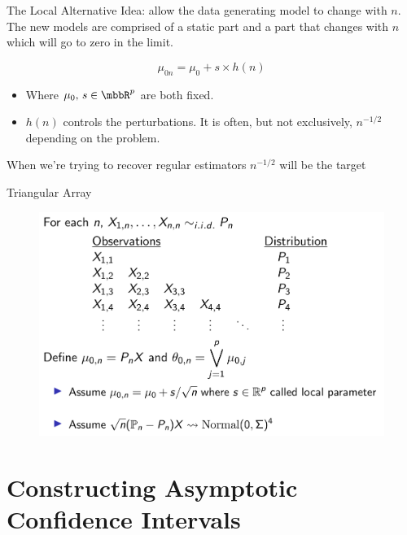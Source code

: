 \documentclass[aspectratio=169, professionalfonts]{beamer}
\begin{document}
\begin{frame}{The Local Alternative}
	Idea: allow the data generating model to change with $n$. The new models are
	comprised of a static part and a part that changes with $n$ which
	will go to zero in the limit.

	$$\mu_{0n} = \mu_0 + s \times h(n)$$
	\begin{itemize}
		\item Where $\mu_0, \,s \in \mbbR^{p}$ are both fixed.
		      \vfill
		\item $h(n)$ controls the perturbations. It is often, but not
		      exclusively, $n^{-1/2}$ depending on the problem.
	\end{itemize}
	\vfill

	When we're trying to recover regular estimators $n^{-1/2}$ will be the target

\end{frame}

\begin{frame}{Triangular Array}
	\begin{figure}
		\includegraphics[width=.85\textwidth]{figures/triangular-array}
	\end{figure}
\end{frame}



\section{Constructing Asymptotic Confidence Intervals}
\end{document}
